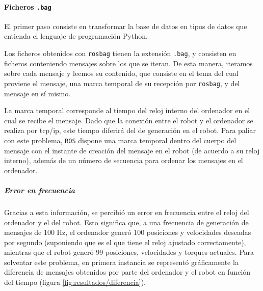 \paragraph{Ficheros \texttt{.bag}}
El primer paso consiste en transformar la base de datos en tipos de datos que entienda el lenguaje de programación Python.

Los ficheros obtenidos con \texttt{rosbag} tienen la extensión \texttt{.bag}, y consisten en ficheros conteniendo mensajes sobre los que se iteran. De esta manera, iteramos sobre cada mensaje y leemos su contenido, que consiste en el tema del cual proviene el mensaje, una marca temporal de su recepción por \texttt{rosbag}, y del mensaje en sí mismo.

La marca temporal corresponde al tiempo del reloj interno del ordenador en el cual se recibe el mensaje. Dado que la conexión entre el robot y el ordenador se realiza por tcp/ip, este tiempo diferirá del de generación en el robot. Para paliar con este problema, \texttt{ROS} dispone una marca temporal dentro del cuerpo del mensaje con el instante de creación del mensaje en el robot (de acuerdo a su reloj interno), además de un número de secuencia para ordenar los mensajes en el ordenador.

\subparagraph{Error en frecuencia}
Gracias a esta información, se percibió un error en frecuencia entre el reloj del ordenador y el del robot. Esto significa que, a una frecuencia de generación de mensajes de 100 Hz, el ordenador generó 100 posiciones y velocidades deseadas por segundo (suponiendo que es el que tiene el reloj ajustado correctamente), mientras que el robot generó 99 posiciones, velocidades y torques actuales. Para solventar este problema, en primera instancia se representó gráficamente la diferencia de mensajes obtenidos por parte del ordenador y el robot en función del tiempo (figura \ref{fig:resultados/diferencia}).

